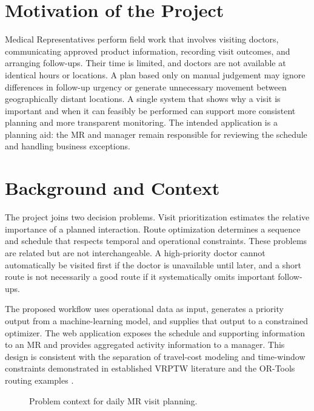 \documentclass[12pt,a4paper,oneside]{report}
\begin{document}
\section{Motivation of the Project}
Medical Representatives perform field work that involves visiting doctors, communicating approved product information, recording visit outcomes, and arranging follow-ups. Their time is limited, and doctors are not available at identical hours or locations. A plan based only on manual judgement may ignore differences in follow-up urgency or generate unnecessary movement between geographically distant locations. A single system that shows why a visit is important and when it can feasibly be performed can support more consistent planning and more transparent monitoring. The intended application is a planning aid: the MR and manager remain responsible for reviewing the schedule and handling business exceptions.

\section{Background and Context}
The project joins two decision problems. Visit prioritization estimates the relative importance of a planned interaction. Route optimization determines a sequence and schedule that respects temporal and operational constraints. These problems are related but are not interchangeable. A high-priority doctor cannot automatically be visited first if the doctor is unavailable until later, and a short route is not necessarily a good route if it systematically omits important follow-ups.

The proposed workflow uses operational data as input, generates a priority output from a machine-learning model, and supplies that output to a constrained optimizer. The web application exposes the schedule and supporting information to an MR and provides aggregated activity information to a manager. This design is consistent with the separation of travel-cost modeling and time-window constraints demonstrated in established VRPTW literature and the OR-Tools routing examples \cite{solomon1987,ortoolsVRPTW}.

\begin{figure}[htbp]
\centering
{}
\caption{Problem context for daily MR visit planning.}
\label{fig:problem-context}
\end{figure}
\end{document}
